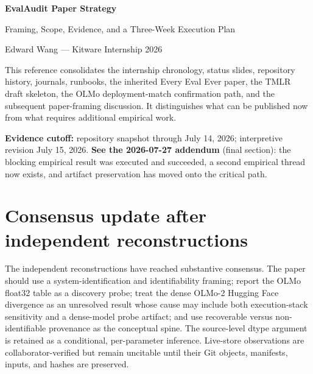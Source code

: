 \documentclass[11pt]{article}
\begin{document}

\begin{titlepage}
\centering
\vspace*{0.85in}
{\Huge\bfseries\color{kitblue} EvalAudit Paper Strategy\par}
\vspace{0.18in}
{\LARGE Framing, Scope, Evidence, and a Three-Week Execution Plan\par}
\vspace{0.55in}
{\Large Edward Wang --- Kitware Internship 2026\par}
\vfill
\begin{minipage}{0.84\textwidth}
\small
This reference consolidates the internship chronology, status slides, repository history, journals, runbooks, the inherited Every Eval Ever paper, the TMLR draft skeleton, the OLMo deployment-match confirmation path, and the subsequent paper-framing discussion. It distinguishes what can be published now from what requires additional empirical work.

\textbf{Evidence cutoff:} repository snapshot through July 14, 2026; interpretive revision July 15, 2026. \textbf{See the 2026-07-27 addendum} (final section): the blocking empirical result was executed and succeeded, a second empirical thread now exists, and artifact preservation has moved onto the critical path.
\end{minipage}
\end{titlepage}

\tableofcontents
\clearpage
{}


\section{Consensus update after independent reconstructions}

The independent reconstructions have reached substantive consensus. The paper
should use a system-identification and identifiability framing; report the OLMo
float32 table as a discovery probe; treat the dense OLMo-2 Hugging Face divergence
as an unresolved result whose cause may include both execution-stack sensitivity
and a dense-model probe artifact; and use recoverable versus non-identifiable
provenance as the conceptual spine. The source-level dtype argument is retained as
a conditional, per-parameter inference. Live-store observations are
collaborator-verified but remain uncitable until their Git objects, manifests, inputs,
and hashes are preserved.
\end{document}
